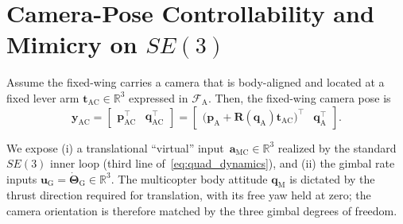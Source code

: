\documentclass[letterpaper, 10 pt, conference]{ieeeconf}  %
\newtheorem{theorem}{Theorem}
\begin{document}
\section{Camera-Pose Controllability and Mimicry on $SE(3)$}
\label{sec:proof}

Assume the fixed-wing carries a camera that is body-aligned and located at a fixed lever arm $\mathbf{t}_\text{AC} \in \mathbb{R}^3$ expressed in $\mathcal{F}_\text{A}$.
Then, the fixed-wing camera pose is
\begin{equation}
\mathbf{y}_\text{AC} = \begin{bmatrix} \mathbf{p}_\text{AC}^\top & \mathbf{q}_\text{AC}^\top \end{bmatrix}
= \begin{bmatrix} \big( \mathbf{p}_\text{A} + \mathbf{R}\left( \mathbf{q}_\text{A} \right) \mathbf{t}_\text{AC} \big)^\top & \mathbf{q}_\text{A}^\top \end{bmatrix}.
\label{eq:plane_camera_pose}
\end{equation}



We expose (i) a translational ``virtual'' input $\,\mathbf{a}_\text{MC} \in \mathbb{R}^3$ realized by the standard $SE(3)$ inner loop (third line of~\eqref{eq:quad_dynamics}), and (ii) the gimbal rate inputs $\mathbf{u}_\text{G} = \dot{\boldsymbol{\Theta}}_\text{G} \in \mathbb{R}^3$. The multicopter body attitude $\mathbf{q}_\text{M}$ is dictated by the thrust direction required for translation, with its free yaw held at zero; the camera orientation is therefore matched by the three gimbal degrees of freedom.
\end{document}
